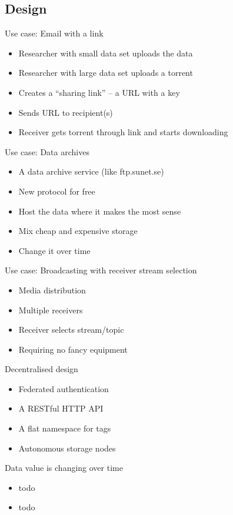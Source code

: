 \documentclass{beamer}
\begin{document}
\subsection{Design}
\begin{frame}{Use case: Email with a link}
  \begin{itemize}
  \item
    Researcher with small data set uploads the data
  \item
    Researcher with large data set uploads a torrent
  \item
    Creates a ``sharing link'' -- a URL with a key
  \item
    Sends URL to recipient(s)
  \item
    Receiver gets torrent through link and starts downloading
  \end{itemize}
\end{frame}
\begin{frame}{Use case: Data archives}
  \begin{itemize}
  \item
    A data archive service (like ftp.sunet.se)
  \item
    New protocol for free
  \item
    Host the data where it makes the most sense
  \item
    Mix cheap and expensive storage
  \item
    Change it over time
  \end{itemize}
\end{frame}
\begin{frame}{Use case: Broadcasting with receiver stream selection}
  \begin{itemize}
  \item
    Media distribution
  \item
    Multiple receivers
  \item
    Receiver selects stream/topic
  \item
    Requiring no fancy equipment
  \end{itemize}
\end{frame}
\begin{frame}{Decentralised design}
  \begin{itemize}
  \item
    Federated authentication
  \item
    A RESTful HTTP API
  \item
    A flat namespace for tags
  \item
    Autonomous storage nodes 
  \end{itemize}
\end{frame}
\begin{frame}{Data value is changing over time}
  \begin{itemize}
  \item
    todo
  \end{itemize}
\end{frame}
\begin{frame}{}
  \begin{itemize}
  \item
    todo
  \end{itemize}
\end{frame}
\end{document}
